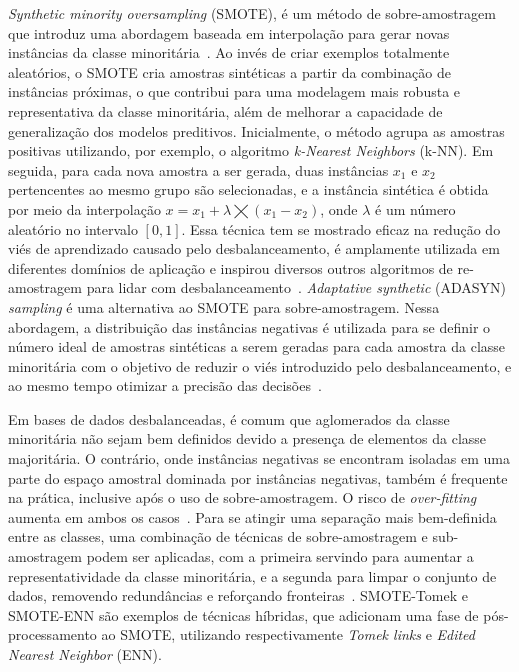 \textit{Synthetic minority oversampling} (SMOTE), é um método de sobre-amostragem que introduz uma abordagem baseada em interpolação para gerar novas instâncias da classe minoritária~\cite{Wei2025}. Ao invés de criar exemplos totalmente aleatórios, o SMOTE cria amostras sintéticas a partir da combinação de instâncias próximas, o que contribui para uma modelagem mais robusta e representativa da classe minoritária, além de melhorar a capacidade de generalização dos modelos preditivos. Inicialmente, o método agrupa as amostras positivas utilizando, por exemplo, o algoritmo \textit{k-Nearest Neighbors} (k-NN). Em seguida, para cada nova amostra a ser gerada, duas instâncias \(x_{1}\) e \(x_{2}\) pertencentes ao mesmo grupo são selecionadas, e a instância sintética é obtida por meio da interpolação \(x = x_{1} + \lambda \bigtimes (x_{1} - x_{2})\), onde \(\lambda\) é um número aleatório no intervalo \([0, 1]\). Essa técnica tem se mostrado eficaz na redução do viés de aprendizado causado pelo desbalanceamento, é amplamente utilizada em diferentes domínios de aplicação e inspirou diversos outros algoritmos de re-amostragem para lidar com desbalanceamento~\cite{Fernndez2018}. \textit{Adaptative synthetic} (ADASYN) \textit{sampling} é uma alternativa ao SMOTE para sobre-amostragem. Nessa abordagem, a distribuição das instâncias negativas é utilizada para se definir o número ideal de amostras sintéticas a serem geradas para cada amostra da classe minoritária com o objetivo de reduzir o viés introduzido pelo desbalanceamento, e ao mesmo tempo otimizar a precisão das decisões~\cite{He2008}.

Em bases de dados desbalanceadas, é comum que aglomerados da classe minoritária não sejam bem definidos devido a presença de elementos da classe majoritária. O contrário, onde instâncias negativas se encontram isoladas em uma parte do espaço amostral dominada por instâncias negativas, também é frequente na prática, inclusive após o uso de sobre-amostragem. O risco de \textit{over-fitting} aumenta em ambos os casos~\cite{Batista2004}. Para se atingir uma separação mais bem-definida entre as classes, uma combinação de técnicas de sobre-amostragem e sub-amostragem podem ser aplicadas, com a primeira servindo para aumentar a representatividade da classe minoritária, e a segunda para limpar o conjunto de dados, removendo redundâncias e reforçando fronteiras~\cite{Pereira2020}. SMOTE-Tomek e SMOTE-ENN são exemplos de técnicas híbridas, que adicionam uma fase de pós-processamento ao SMOTE, utilizando respectivamente \textit{Tomek links} e \textit{Edited Nearest Neighbor} (ENN).
